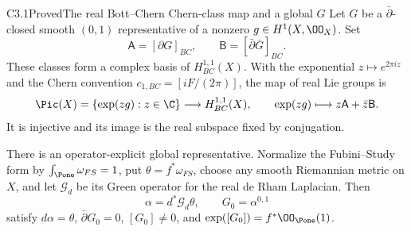 \begin{claim}{C3.1}{Proved}{The real Bott--Chern Chern-class map and a global $G$}
Let $G$ be a $\bar\partial$-closed smooth $(0,1)$ representative of
a nonzero $g\in H^1(X,\OO_X)$.  Set
\[
\mathsf A=[\partial G]_{BC},\qquad
\mathsf B=[\bar\partial\bar G]_{BC}.
\]
These classes form a complex basis of $H^{1,1}_{BC}(X)$.
With the exponential $z\mapsto e^{2\pi iz}$ and the Chern convention
$c_{1,BC}=[iF/(2\pi)]$, the map of real Lie groups is
\begin{equation}\label{eq:C-Pic-map}
\Pic(X)=\{\exp(zg):z\in\C\}\longrightarrow H^{1,1}_{BC}(X),
\qquad \exp(zg)\longmapsto z\mathsf A+\bar z\mathsf B.
\end{equation}
It is injective and its image is the real subspace fixed by conjugation.

There is an operator-explicit global representative.  Normalize the
Fubini--Study form by $\int_{\Pone}\omega_{FS}=1$, put
$\theta=f^*\omega_{FS}$, choose any smooth Riemannian metric on $X$,
and let $\mathcal G_d$ be its Green operator for the real de Rham
Laplacian.  Then
\begin{equation}\label{eq:C-G-Green}
\alpha=d^*\mathcal G_d\theta,\qquad G_0=\alpha^{0,1}
\end{equation}
satisfy $d\alpha=\theta$, $\bar\partial G_0=0$,
$[G_0]\ne0$, and $\exp([G_0])=f^*\OO_{\Pone}(1)$.
\end{claim}
